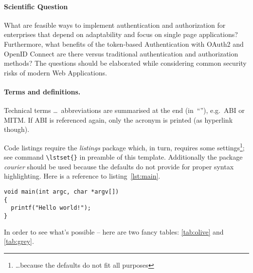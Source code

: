 \paragraph{Scientific Question}
What are feasible ways to implement authentication and authorization for enterprises that depend on adaptability and focus on single page applications? Furthermore, what benefits of the token-based Authentication with OAuth2 and OpenID Connect are there versus traditional authentication and authorization methods? The questions should be elaborated while considering common security risks of modern Web Applications.







\paragraph{Terms and definitions.}
Technical terms \ldots\ abbreviations are summarised at the end (in~``''), e.g.\ \ac{ABI} or \ac{MITM}. If \ac{ABI} is referenced again, only the acronym is printed (as hyperlink though).

Code listings require the \textit{listings} package which, in turn, requires some settings\footnote{\ldots because the defaults do not fit all purposes}; see command \verb+\lstset{}+ in preamble of this template. Additionally the package \textit{courier} should be used because the defaults do not provide for proper syntax highlighting. Here is a reference to listing~\ref{lst:main}.

\lstset{caption=Main programme, basicstyle=\small\ttfamily, label=lst:main, language=C}
\begin{lstlisting}
void main(int argc, char *argv[])
{
  printf("Hello world!");
}
\end{lstlisting}

In order to see what's possible -- here are two fancy tables: \ref{tab:olive} and \ref{tab:grey}.

